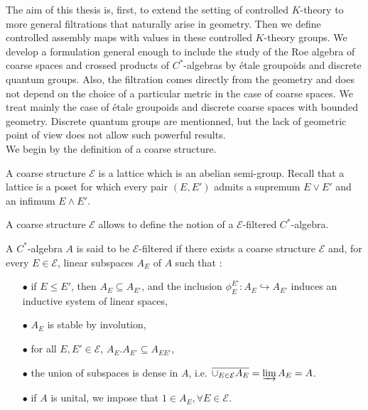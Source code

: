 
The aim of this thesis is, first, to extend the setting of controlled $K$-theory to more general filtrations that naturally arise in geometry. Then we define controlled assembly maps with values in these controlled $K$-theory groups. We develop a formulation general enough to include the study of the Roe algebra of coarse spaces and crossed products of $C^*$-algebras by étale groupoids and discrete quantum groups. Also, the filtration comes directly from the geometry and does not depend on the choice of a particular metric in the case of coarse spaces. We treat mainly the case of étale groupoids and discrete coarse spaces with bounded geometry. Discrete quantum groups are mentionned, but the lack of geometric point of view does not allow such powerful results. \\

We begin by the definition of a coarse structure. 

\begin{definition}
A coarse structure $\mathcal E$ is a lattice which is an abelian semi-group. %
Recall that a lattice is a poset for which every pair $(E,E')$ admits a supremum $E\vee E'$ and an infimum $E\wedge E'$.
\end{definition}

A coarse structure $\mathcal E$ allows to define the notion of a $\mathcal E$-filtered $C^*$-algebra. 

\begin{definition}
A $C^*$-algebra $A$ is said to be $\mathcal E$-filtered if there exists a coarse structure $\mathcal E$ and, for every $E\in \mathcal E$, linear subspaces $A_E$ of $A$ such that :\\
\begin{itemize}
\item[$\bullet$] if $E \leq E'$, then $A_E\subseteq A_{E'}$, and the inclusion $\phi_E^{E'}: A_E\hookrightarrow A_{E'}$ induces an inductive system of linear spaces,
\item[$\bullet$] $A_E$ is stable by involution,
\item[$\bullet$] for all $E,E'\in\mathcal E$, $A_E.A_{E'}\subseteq A_{EE'}$,
\item[$\bullet$] the union of subspaces is dense in $A$, i.e. $\overline{\cup_{E\in\mathcal E}A_E} = \varinjlim A_E = A$.
\item[$\bullet$] if $A$ is unital, we impose that $1\in A_E,\forall E\in\mathcal E$.
\end{itemize}
\end{definition} 

